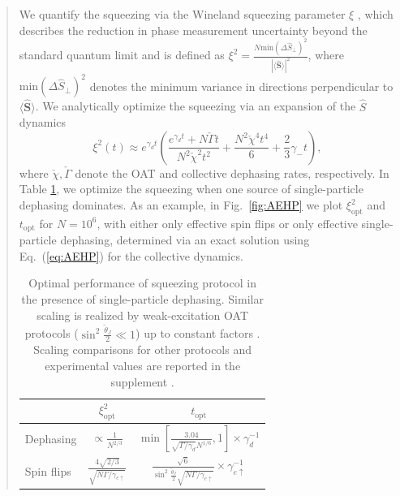 \begin{abstract}
We quantify the squeezing via the Wineland squeezing parameter $\xi$ \cite{Wineland1992, Wineland1994}, which describes the reduction in phase measurement uncertainty beyond the standard quantum limit and is defined as $\xi^2 = \frac{N \text{min} (\Delta \hat{S}_{\perp})^2}{|\langle \hat{\mathbf{S}} \rangle|^2}$, where $\text{min}(\Delta \hat{S}_{\perp})^2$ denotes the minimum variance in directions perpendicular to $\langle \hat{\mathbf{S}} \rangle$. We analytically optimize the squeezing via an expansion of the $\hat S$ dynamics \cite{suppcite, Chu2021, Barberena2023b}
\begin{equation}
    \xi^2(t) \approx e^{\gamma_d t}\left(\frac{e^{\gamma_d t} + N \check{\Gamma} t}{N^2 \check{\chi}^2 t^2} + \frac{N^2 \check{\chi}^4 t^4}{6} + \frac{2}{3} \gamma_- t\right),
\end{equation}
where $\check \chi, \check \Gamma$ denote the OAT and collective dephasing rates, respectively. 
In Table \ref{tab:optsq}, we optimize the squeezing when one source of single-particle dephasing dominates.
As an example, in Fig.~\ref{fig:AEHP} we plot $\xi^2_{\text{opt}}$ and $t_{\text{opt}}$
for $N=10^6$, with either only effective spin flips or only effective single-particle dephasing, determined via an exact solution \cite{Chu2021} using Eq.~(\ref{eq:AEHP}) for the collective dynamics. 

\begin{table}
\centering
\def\arraystretch{1}
\setlength\tabcolsep{3.5mm}
\begin{tabular}{lcc}
\toprule
\toprule
   & $\xi^2_{\text{opt}}$ & $t_{\text{opt}}$ \\
\midrule
 Dephasing & $\propto \frac{1}{N^{2/3}}$ & $\min\left[\frac{3.04}{\sqrt{\Gamma /\gamma_d} N^{1/6}},1\right] \times \gamma_d^{-1}$\\
 Spin flips &  $ \frac{4\sqrt{2/3}}{\sqrt{N \Gamma/\gamma_{e{\uparrow}}}}$ & $\frac{\sqrt{6}}{ \sin^2 \frac{\tilde{\theta}_J}{2} \sqrt{N \Gamma/\gamma_{e{\uparrow}}}} \times \gamma_{e \uparrow}^{-1}$ \\
 \bottomrule
 \bottomrule
\end{tabular}
\caption{Optimal performance of squeezing protocol in the presence of single-particle dephasing. Similar scaling is realized by weak-excitation OAT protocols ($\sin^2 \frac{\tilde{\theta}_J}{2} \ll 1$) up to constant factors \cite{Schleier-Smith2010, Borregaard2017, Lewis-Swan2018, suppcite}. Scaling comparisons for other protocols and experimental values are reported in the supplement \cite{suppcite}. \label{tab:optsq}}
\end{table}


\end{abstract}
